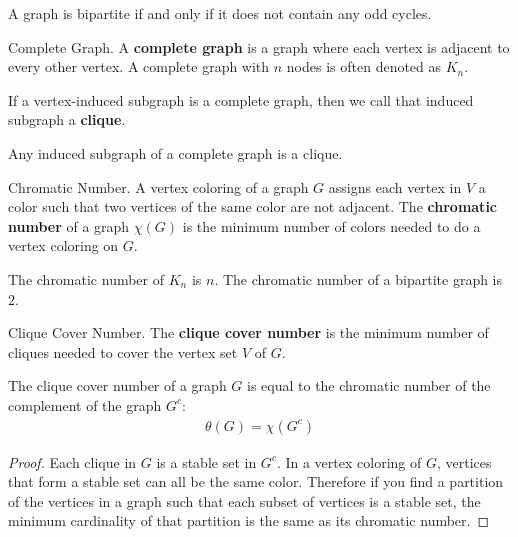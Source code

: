 \begin{nonumtheorem}
    \label{thm:bipartite-odd}
    A graph is bipartite if and only if it does not contain any odd cycles.
\end{nonumtheorem}

\begin{definition}{Complete Graph.}
    \label{defn:clique}
    A \textbf{complete graph} is a graph where each vertex is adjacent to every other vertex. A complete graph with $n$ nodes is often denoted as $K_n$.
\end{definition}

If a vertex-induced subgraph is a complete graph, then we call that induced subgraph a \textbf{clique}.

\begin{remark}
    Any induced subgraph of a complete graph is a clique.
\end{remark}

\begin{definition}{Chromatic Number.}
    \label{defn:colors}
	A vertex coloring of a graph $G$ assigns each vertex in $V$ a color such that two vertices of the same color are not adjacent. The \textbf{chromatic number} of a graph $\chi(G)$ is the minimum number of colors needed to do a vertex coloring on $G$.
\end{definition}

\begin{remark}
    The chromatic number of $K_n$ is $n$. The chromatic number of a bipartite graph is $2$.
\end{remark}

\begin{definition}{Clique Cover Number.}
    \label{defn:clique-cover-num}
    The \textbf{clique cover number} is the minimum number of cliques needed to cover the vertex set $V$ of $G$.
\end{definition}

\begin{proposition}
    \label{prop:chrom-clique}
    The clique cover number of a graph $G$ is equal to the chromatic number of the complement of the graph $G^c$:
    \begin{align}
        \theta(G) = \chi(G^c)
    \end{align}
\end{proposition}

\begin{proof}
    Each clique in $G$ is a stable set in $G^c$. In a vertex coloring of $G$, vertices that form a stable set can all be the same color. Therefore if you find a partition of the vertices in a graph such that each subset of vertices is a stable set, the minimum cardinality of that partition is the same as its chromatic number.
\end{proof}

